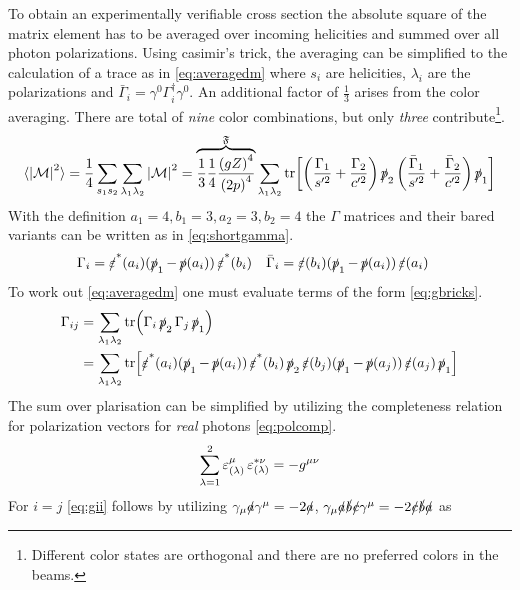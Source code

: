 %
To obtain an experimentally verifiable cross section the absolute
square of the matrix element has to be averaged over incoming
helicities and summed over all photon polarizations. Using casimir's
trick, the averaging can be simplified to the calculation of a trace
as in \cref{eq:averagedm} where \(s_i\) are helicities, \(\lambda_i\)
are the polarizations and
\(\bar{\Gamma}_i=\gamma^0\Gamma^\dagger_i\gamma^0\). An additional
factor of \(\frac{1}{3}\) arises from the color averaging. There are
total of \emph{nine} color combinations, but only \emph{three}
contribute\footnote{Different color states are orthogonal and there
  are no preferred colors in the beams.}.
%
\begin{equation}
  \label{eq:averagedm}
  \langle\abs{\mathcal{M}}^2\rangle = \frac{1}{4}\sum_{s_1 s_2}\sum_{\lambda_1
    \lambda_2} \abs{\mathcal{M}}^2=\overbrace{\frac{1}{3}\frac{1}{4}\frac{\qty(gZ)^4}{\qty(2p)^4}}^\mathfrak{F}\sum_{\lambda_1
    \lambda_2}\tr[\qty(\frac{\Gamma_1}{s'^2}+\frac{\Gamma_2}{c'^2})
  \ps_2\qty(\frac{\bar{\Gamma}_1}{s'^2}+\frac{\bar{\Gamma}_2}{c'^2})\ps_1]
\end{equation}
%
With the definition \(a_1=4,b_1=3,a_2=3,b_2=4\) the \(\Gamma\)
matrices and their bared variants can be written as in \cref{eq:shortgamma}.
%
\begin{align}
  \label{eq:shortgamma}
  \Gamma_i &= \pses(a_i)(\ps_1 - \ps(a_i))\pses(b_i) & \bar{\Gamma}_i &= \pes(b_i)(\ps_1 - \ps(a_i))\pes(a_i)
\end{align}
%
To work out \cref{eq:averagedm} one must evaluate terms of the
form \cref{eq:gbricks}.
%
\begin{equation}
  \label{eq:gbricks}
  \begin{split}
    \Gamma_{ij} &= \sum_{\lambda_1\lambda_2}
    \tr(\Gamma_i\ps_2\Gamma_j\ps_1)\\
    &= \sum_{\lambda_1\lambda_2}
    \tr[\pses(a_i)(\ps_1-\ps(a_i))\pses(b_i)\ps_2\pes(b_j)(\ps_1 -
    \ps(a_j))\pes(a_j)\ps_1]
  \end{split}
\end{equation}
%
The sum over plarisation can be simplified by utilizing the
completeness relation for polarization vectors for \emph{real} photons
\cref{eq:polcomp}.
%
\begin{equation}
  \label{eq:polcomp}
  \sum_{\lambda=1}^{2}\pe_{(\lambda)}^\mu\pe_{(\lambda)}^{*\nu} = -g^{\mu\nu}
\end{equation}
%
For \(i=j\) \cref{eq:gii} follows by utilizing
\(\gamma_\mu\sl{a}\gamma^\mu=-2\sl{a}\),
\(\gamma_\mu\sl{a}\sl{b}\sl{c}\gamma^\mu=-2\sl{c}\sl{b}\sl{a}\) as
